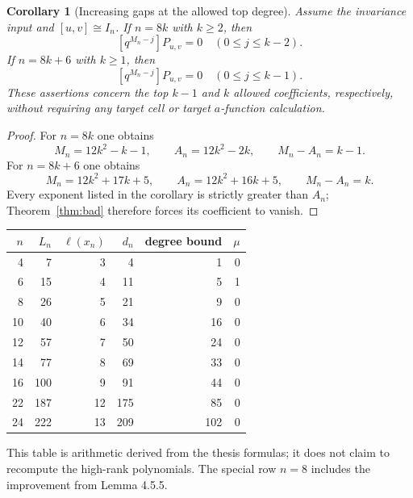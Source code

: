 \documentclass[11pt]{article}
\newtheorem{corollary}[theorem]{Corollary}
\theoremstyle{definition}\newtheorem{definition}[theorem]{Definition}
\theoremstyle{remark}\newtheorem{remark}[theorem]{Remark}
\begin{document}
\begin{corollary}[Increasing gaps at the allowed top degree]\label{cor:gaps}
Assume the invariance input and $[u,v]\cong I_n$.
If $n=8k$ with $k\geq2$, then
\[
 [q^{M_n-j}]P_{u,v}=0\quad(0\leq j\leq k-2).
\]
If $n=8k+6$ with $k\geq1$, then
\[
 [q^{M_n-j}]P_{u,v}=0\quad(0\leq j\leq k-1).
\]
These assertions concern the top $k-1$ and $k$ \emph{allowed}
coefficients, respectively, without requiring any target cell or
target $a$-function calculation.
\end{corollary}
\begin{proof}
For $n=8k$ one obtains
\[
 M_n=12k^2-k-1,\qquad A_n=12k^2-2k,
 \qquad M_n-A_n=k-1.
\]
For $n=8k+6$ one obtains
\[
 M_n=12k^2+17k+5,\qquad A_n=12k^2+16k+5,
 \qquad M_n-A_n=k.
\]
Every exponent listed in the corollary is strictly greater than $A_n$;
Theorem~\ref{thm:bad} therefore forces its coefficient to vanish.
\end{proof}

\begin{center}
\begin{tabular}{rrrrrr}
\toprule
$n$&$L_n$&$\ell(x_n)$&$d_n$&degree bound&$\mu$\\
\midrule
4&7&3&4&1&0\\
6&15&4&11&5&1\\
8&26&5&21&9&0\\
10&40&6&34&16&0\\
12&57&7&50&24&0\\
14&77&8&69&33&0\\
16&100&9&91&44&0\\
22&187&12&175&85&0\\
24&222&13&209&102&0\\
\bottomrule
\end{tabular}
\end{center}
This table is arithmetic derived from the thesis formulas; it does not
claim to recompute the high-rank polynomials. The special row $n=8$
includes the improvement from Lemma 4.5.5.
\end{document}
